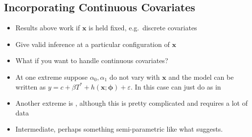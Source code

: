 \subsection{Incorporating Continuous Covariates}
\label{sec:covariates}

\begin{itemize}
  \item Results above work if $\mathbf{x}$ is held fixed, e.g.\ discrete covariates
  \item Give valid inference at a particular configuration of $\mathbf{x}$
  \item What if you want to handle continuous covariates?
  \item At one extreme suppose $\alpha_0, \alpha_1$ do not vary with $\mathbf{x}$ and the model can be written as $y = c + \beta T^* + h(\mathbf{x}; \boldsymbol{\phi}) + \varepsilon$. In this case can just do as in \cite{FL}
  \item Another extreme is \cite{andrews2014nonparametric}, although this is pretty complicated and requires a lot of data
  \item Intermediate, perhaps something semi-parametric like what \cite{Lewbel} suggests.
\end{itemize}
